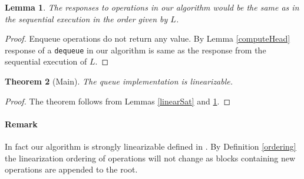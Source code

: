\documentclass[10pt]{article}
\renewcommand{\tt}[1]{\texttt{#1}}
\newtheorem{theorem}{Theorem}
\newtheorem{lemma}[theorem]{Lemma}
\theoremstyle{definition}
\begin{document}
\begin{lemma}\label{linearCorrect}
The responses to operations in our algorithm would be the same as in the sequential execution in the order given by $L$.
\end{lemma}
\begin{proof}
Enqueue operations do not return any value. By Lemma \ref{computeHead} response of a \tt{dequeue} in our algorithm is same as the response from the sequential execution of $L$.  
\end{proof}

\begin{theorem}[Main]
The queue implementation is linearizable.
\end{theorem}
\begin{proof}
The theorem follows from Lemmas \ref{linearSat} and \ref{linearCorrect}.
\end{proof}

\paragraph{Remark} In fact our algorithm is strongly linearizable defined in \cite{DBLP:conf/stoc/GolabHW11}. By Definition \ref{ordering} the linearization ordering of operations will not change as blocks containing new operations are appended to the root.
\pagebreak
\end{document}
